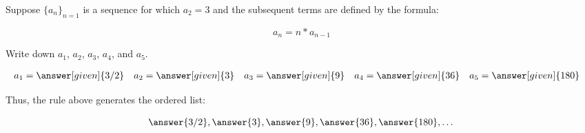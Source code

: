 \documentclass{ximera}
\author{Jim Talamo}
\begin{document}
\begin{exercise}

Suppose $\{a_n\}_{n=1}$ is a sequence for which $a_2=3$ and the subsequent terms are defined by the formula:

\[a_n = n*a_{n-1} \]

Write down $a_1$, $a_2$, $a_3$, $a_4$, and $a_5$.

    \begin{align*}
      a_1 &= \answer[given]{3/2} & 
      a_2 &= \answer[given]{3} & 
      a_3 &= \answer[given]{9} & 
      a_4 &= \answer[given]{36} & 
      a_5 &= \answer[given]{180} 
    \end{align*}

\begin{exercise}    
Thus, the rule above generates the ordered list:

\[
\answer{3/2} ,\answer{3},\answer{9},\answer{36},\answer{180}, \dots
\]   



\end{exercise}
\end{exercise}
\end{document}
